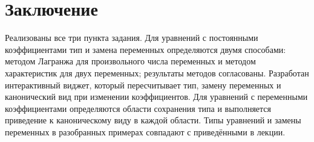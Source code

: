 \documentclass[a4paper,12pt]{article}
\begin{document}
\section*{Заключение}

Реализованы все три пункта задания. Для уравнений с постоянными коэффициентами тип
и замена переменных определяются двумя способами: методом Лагранжа для
произвольного числа переменных и методом характеристик для двух переменных;
результаты методов согласованы. Разработан интерактивный виджет, который
пересчитывает тип, замену переменных и канонический вид при изменении
коэффициентов. Для уравнений с переменными коэффициентами определяются области
сохранения типа и выполняется приведение к каноническому виду в каждой области.
Типы уравнений и замены переменных в разобранных примерах совпадают с
приведёнными в лекции.
\end{document}
